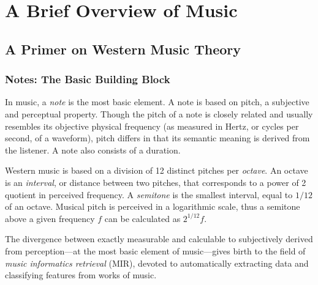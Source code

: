 \chapter{A Brief Overview of Music}

\section{A Primer on Western Music Theory}

\subsection{Notes: The Basic Building Block}

In music, a \textit{note} is the most basic element. A note is based on pitch, a subjective and perceptual property. Though the pitch of a note is closely related and usually resembles its objective physical frequency (as measured in Hertz, or cycles per second, of a waveform), pitch differs in that its semantic meaning is derived from the listener. A note also consists of a duration.

Western music is based on a division of 12 distinct pitches per \textit{octave}. An octave is an \textit{interval}, or distance between two pitches, that corresponds to a power of 2 quotient in perceived frequency. A \textit{semitone} is the smallest interval, equal to $1/12$ of an octave. Musical pitch is perceived in a logarithmic scale, thus a semitone above a given frequency $f$ can be calculated as $2^{1/12} f$.

The divergence between exactly measurable and calculable to subjectively derived from perception---at the most basic element of music---gives birth to the field of \textit{music informatics retrieval} (MIR), devoted to automatically extracting data and classifying features from works of music.